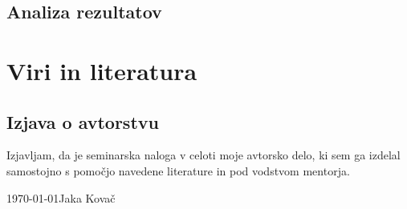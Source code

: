 \documentclass[12pt]{article}
\begin{document}
    \subsection*{Analiza rezultatov}



\newpage
\begingroup
\makeatletter
    \section{Viri in literatura}
    \nocite{*}
    \printbibliography[heading=none]
\makeatother
\endgroup
\newpage

\begin{samepage}
    \thispagestyle{empty}
    \section*{Izjava o avtorstvu}
    Izjavljam, da je seminarska naloga v celoti moje avtorsko delo, ki sem ga 
    izdelal samostojno s pomočjo navedene literature in pod vodstvom mentorja.

    \vfill
    
    \today \hfill Jaka Kovač
    
    \vspace{3 cm}
\end{samepage}
\end{document}
